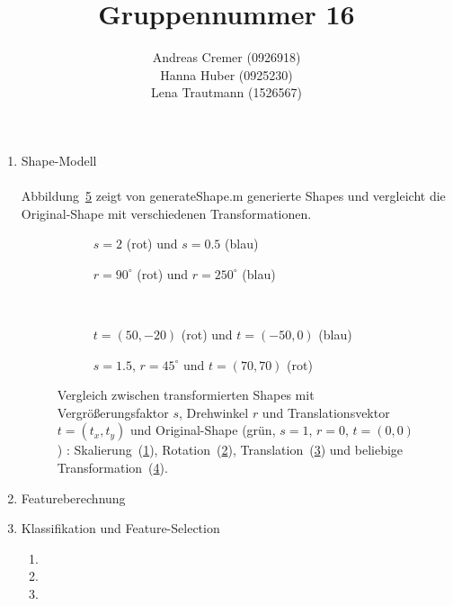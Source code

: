 \documentclass[]{report}
\title{Gruppennummer 16}
\author{Andreas Cremer (0926918)\\Hanna Huber (0925230) \\Lena Trautmann (1526567)}
\newlength\figureheight
\newlength\figurewidth
\begin{document}
	\maketitle
	
	
	\begin{enumerate}
		\item Shape-Modell \\\\
			Abbildung~\ref{fig:trafo} zeigt von generateShape.m generierte Shapes und vergleicht die Original-Shape mit verschiedenen Transformationen.
			\setlength\figureheight{3.5cm}
			\setlength{}
			\begin{figure}
				\begin{subfigure}{0.45\textwidth}
					\centering
					
					\caption{$s=2$ (rot) und $s=0.5$ (blau)}
					\label{fig:s}
				\end{subfigure}
				\qquad
				\begin{subfigure}{0.45\textwidth}
					\centering
					
					\caption{$r=90^\circ$ (rot) und $r=250^\circ$  (blau)}
					\label{fig:r}
				\end{subfigure}	
				\\
				\begin{subfigure}{0.45\textwidth}
					\centering
					
					\caption{$t=(50,-20)$ (rot) und $t=(-50,0)$ (blau)}
					\label{fig:t}
				\end{subfigure}
				\qquad
				\begin{subfigure}{0.45\textwidth}
					\centering
					
					\caption{$s=1.5$, $r=45^\circ$ und $t=(70,70)$ (rot)}
					\label{fig:mix}
				\end{subfigure}	
				\caption{Vergleich zwischen transformierten Shapes mit Vergrößerungsfaktor $s$, Drehwinkel $r$ und Translationsvektor $t=(t_x,t_y)$ und Original-Shape (grün, $s=1$, $r=0$, $t=(0,0)$) : Skalierung~(\ref{fig:s}), Rotation~(\ref{fig:r}), Translation~(\ref{fig:t}) und beliebige Transformation~(\ref{fig:mix}).}
				\label{fig:trafo}
			\end{figure}
			

		\item Featureberechnung
			
		\item Klassifikation und Feature-Selection
			\begin{enumerate}
				\item
				\item
				\item 
			\end{enumerate}
		

\end{enumerate}
\end{document}
